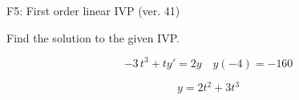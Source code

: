\begin{exercise}
  \begin{exerciseTitle}F5: First order linear IVP (ver. 41)\end{exerciseTitle}
  \begin{exerciseStatement}
    
Find the solution to the given IVP.

    
\[-3 \, t^{3} +ty'= 2 y \hspace{1em} y( -4 ) = -160\]

  \end{exerciseStatement}
  \begin{exerciseAnswer}
    
\[y= 2 t^ 2 +3 t^{3}\]

  \end{exerciseAnswer}
\end{exercise}